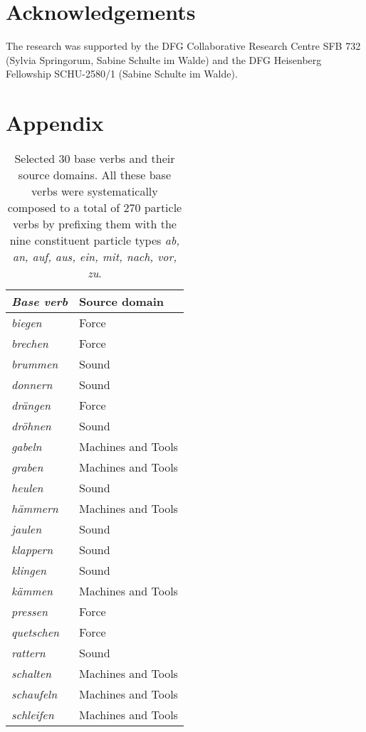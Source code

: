 \documentclass[output=paper]{langsci/langscibook}
\begin{document}
\section*{Acknowledgements}

The research was supported by the DFG Collaborative Research Centre
SFB 732 (Sylvia Springorum, Sabine Schulte im Walde) and the DFG
Heisenberg Fellowship SCHU-2580/1 (Sabine Schulte im Walde).

{\sloppy\printbibliography[heading=subbibliography,notkeyword=this]}


\newpage
\section*{Appendix}\largerpage[2]
\begin{table}[H]
  \caption{Selected 30 base verbs and their source domains. All these
    base verbs were systematically composed to a total of 270 particle
    verbs by prefixing them with the nine constituent particle types
    \textit{ab, an, auf, aus, ein, mit, nach, vor, zu}.\label{tab:bv-sd}}
  \begin{tabular}{>{\itshape}ll}
    \lsptoprule
    \normalfont Base verb & Source domain \\ \midrule
    biegen & Force \\
    brechen & Force \\
    brummen & Sound \\
    donnern & Sound \\
    drängen & Force \\
    dröhnen & Sound \\
    gabeln & Machines and Tools \\
    graben & Machines and Tools \\
    heulen & Sound \\
    hämmern & Machines and Tools \\
    jaulen & Sound \\
    klappern & Sound \\
    klingen & Sound \\
    kämmen & Machines and Tools \\
    pressen & Force \\
    quetschen & Force \\
    rattern & Sound \\
    schalten & Machines and Tools \\
    schaufeln & Machines and Tools \\
    schleifen & Machines and Tools \\

\end{tabular}
\end{table}
\end{document}
